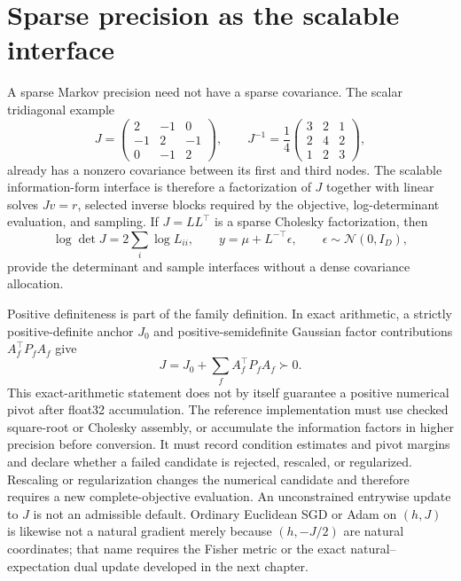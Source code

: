 \section{Sparse precision as the scalable interface}

A sparse Markov precision need not have a sparse covariance.  The scalar tridiagonal example
\begin{equation}
J=\begin{pmatrix}
2&-1&0\\
-1&2&-1\\
0&-1&2
\end{pmatrix},
\qquad
J^{-1}=\frac14\begin{pmatrix}
3&2&1\\
2&4&2\\
1&2&3
\end{pmatrix},
\label{eq:tridiagonal-precision-dense-covariance}
\end{equation}
already has a nonzero covariance between its first and third nodes.  The scalable information-form interface is therefore a factorization of $J$ together with linear solves $Jv=r$, selected inverse blocks required by the objective, log-determinant evaluation, and sampling.  If $J=LL^\top$ is a sparse Cholesky factorization, then
\begin{equation}
\log\det J=2\sum_i\log L_{ii},
\qquad
y=\mu+L^{-\top}\epsilon,
\qquad
\epsilon\sim\mathcal N(0,I_D),
\label{eq:sparse-factor-logdet-sampling}
\end{equation}
provide the determinant and sample interfaces without a dense covariance allocation.

Positive definiteness is part of the family definition. In exact arithmetic, a strictly positive-definite anchor $J_0$ and positive-semidefinite Gaussian factor contributions $A_f^\top P_fA_f$ give
\begin{equation}
J=J_0+\sum_f A_f^\top P_fA_f\succ0.
\label{eq:exact-spd-factor-assembly}
\end{equation}
This exact-arithmetic statement does not by itself guarantee a positive numerical pivot after float32 accumulation. The reference implementation must use checked square-root or Cholesky assembly, or accumulate the information factors in higher precision before conversion. It must record condition estimates and pivot margins and declare whether a failed candidate is rejected, rescaled, or regularized. Rescaling or regularization changes the numerical candidate and therefore requires a new complete-objective evaluation. An unconstrained entrywise update to $J$ is not an admissible default. Ordinary Euclidean SGD or Adam on $(h,J)$ is likewise not a natural gradient merely because $(h,-J/2)$ are natural coordinates; that name requires the Fisher metric or the exact natural--expectation dual update developed in the next chapter.
